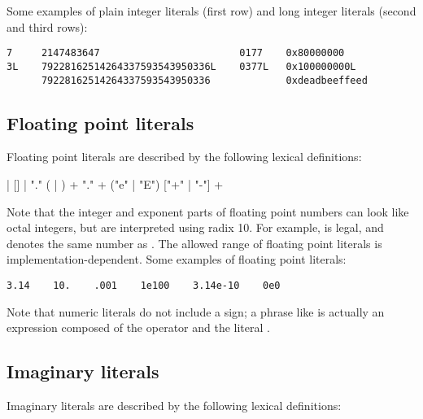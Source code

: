 Some examples of plain integer literals (first row) and long integer
literals (second and third rows):

\begin{verbatim}
7     2147483647                        0177    0x80000000
3L    79228162514264337593543950336L    0377L   0x100000000L
      79228162514264337593543950336             0xdeadbeeffeed						    
\end{verbatim}


\subsection{Floating point literals\label{floating}}

Floating point literals are described by the following lexical
definitions:

\begin{productionlist}
             { | }
             {[]  |  "."}
             {( | )
              }
             {+}
             {"." +}
             {("e" | "E") ["+" | "-"] +}
\end{productionlist}

Note that the integer and exponent parts of floating point numbers
can look like octal integers, but are interpreted using radix 10.  For
example,  is legal, and denotes the same number
as .
The allowed range of floating point literals is
implementation-dependent.
Some examples of floating point literals:

\begin{verbatim}
3.14    10.    .001    1e100    3.14e-10    0e0
\end{verbatim}

Note that numeric literals do not include a sign; a phrase like
 is actually an expression composed of the operator
\code{-} and the literal .


\subsection{Imaginary literals\label{imaginary}}

Imaginary literals are described by the following lexical definitions:

